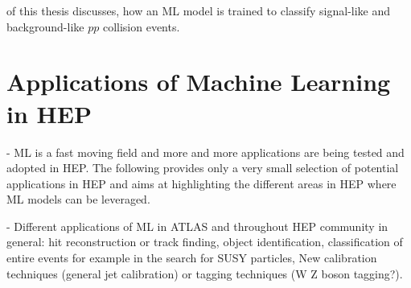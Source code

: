  of this thesis discusses, how an ML model is trained to classify signal-like and background-like $pp$ collision events. 



\section{Applications of Machine Learning in HEP}
- ML is a fast moving field and more and more applications are being tested and adopted in HEP. The following provides only a very small selection of potential applications in HEP and aims at highlighting the different areas in HEP where ML models can be leveraged. 

- Different applications of ML in ATLAS and throughout HEP community in general: hit reconstruction  or track finding, object identification, classification of entire events for example in the search for SUSY particles, New calibration techniques (general jet calibration) or tagging techniques (W Z boson tagging?). 


